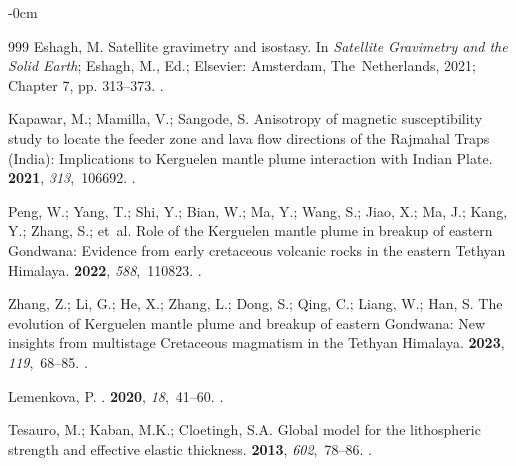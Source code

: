 \documentclass[geomatics,article,accept,pdftex,moreauthors]{Definitions/mdpi}
\begin{document}
\begin{adjustwidth}{-\extralength}{0cm}
\begin{thebibliography}{999}
Eshagh, M.
\newblock Satellite gravimetry and isostasy. In {\em Satellite
  Gravimetry and the Solid Earth}; Eshagh, M., Ed.; Elsevier: Amsterdam, The~Netherlands, %
  2021; Chapter 7, pp.
  313--373.
.

Kapawar, M.; Mamilla, V.; Sangode, S.
\newblock Anisotropy of magnetic susceptibility study to locate the feeder zone
  and lava flow directions of the Rajmahal Traps (India): Implications to
  Kerguelen mantle plume interaction with Indian Plate.
 {\bf 2021}, {\em
  313},~106692.
.

Peng, W.; Yang, T.; Shi, Y.; Bian, W.; Ma, Y.; Wang, S.; Jiao, X.; Ma, J.;
  Kang, Y.; Zhang, S.;  et~al.
\newblock Role of the Kerguelen mantle plume in breakup of eastern Gondwana:
  Evidence from early cretaceous volcanic rocks in the eastern Tethyan
  Himalaya.
 {\bf 2022},
  {\em 588},~110823.
.

Zhang, Z.; Li, G.; He, X.; Zhang, L.; Dong, S.; Qing, C.; Liang, W.; Han, S.
\newblock The evolution of Kerguelen mantle plume and breakup of eastern
  Gondwana: New insights from multistage Cretaceous magmatism in the Tethyan
  Himalaya.
 {\bf 2023}, {\em 119},~68--85.
.

Lemenkova, P.
.
 {\bf 2020},
  {\em 18},~41--60.
.

Tesauro, M.; Kaban, M.K.; Cloetingh, S.A.
\newblock Global model for the lithospheric strength and effective elastic
  thickness.
 {\bf 2013}, {\em 602},~78--86.
.  %


\end{thebibliography}
\end{adjustwidth}
\end{document}
